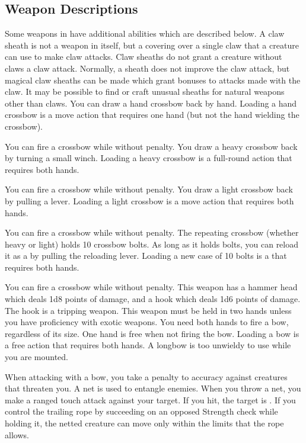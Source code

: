 \subsection{Weapon Descriptions}
Some weapons in  have additional abilities which are described below.
 A claw sheath is not a weapon in itself, but a covering over a single claw that a creature can use to make claw attacks. Claw sheaths do not grant a creature without claws a claw attack. Normally, a sheath does not improve the claw attack, but magical claw sheaths can be made which grant bonuses to attacks made with the claw. It may be possible to find or craft unusual sheaths for natural weapons other than claws.
 You can draw a hand crossbow back by hand. Loading a hand crossbow is a move action that requires one hand (but not the hand wielding the crossbow).
\par You can fire a crossbow while \prone without penalty.
 You draw a heavy crossbow back by turning a small winch. Loading a heavy crossbow is a full-round action that requires both hands.
\par You can fire a crossbow while \prone without penalty.
 You draw a light crossbow back by pulling a lever. Loading a light crossbow is a move action that requires both hands.
\par You can fire a crossbow while \prone without penalty.
 The repeating crossbow (whether heavy or light) holds 10 crossbow bolts. As long as it holds bolts, you can reload it as a  by pulling the reloading lever. Loading a new case of 10 bolts is a  that requires both hands.
\par You can fire a crossbow while \prone without penalty.
 This weapon has a hammer head which deals 1d8 points of damage, and a hook which deals 1d6 points of damage. The hook is a tripping weapon.
 This weapon must be held in two hands unless you have proficiency with exotic weapons.
 You need both hands to fire a bow, regardless of its size. One hand is free when not firing the bow. Loading a bow is a free action that requires both hands. A longbow is too unwieldy to use while you are mounted.
\par When attacking with a bow, you take a  penalty to accuracy against creatures that threaten you.
 A net is used to entangle enemies. When you throw a net, you make a ranged touch attack against your target. If you hit, the target is \slowed. If you control the trailing rope by succeeding on an opposed Strength check while holding it, the netted creature can move only within the limits that the rope allows.
